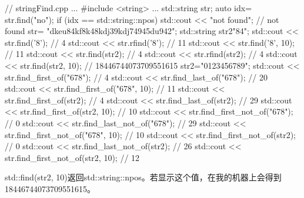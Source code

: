 
\begin{cpp}
// stringFind.cpp
...
#include <string>
...
std::string str;
auto idx= str.find("no");
if (idx == std::string::npos) std::cout << "not found"; // not found
str= {"dkeu84kf8k48kdj39kdj74945du942"};
std::string str2{"84"};
std::cout << str.find('8'); // 4
std::cout << str.rfind('8'); // 11
std::cout << str.find('8', 10); // 11
std::cout << str.find(str2); // 4
std::cout << str.rfind(str2); // 4
std::cout << str.find(str2, 10); // 18446744073709551615
str2="0123456789";
std::cout << str.find_first_of("678"); // 4
std::cout << str.find_last_of("678"); // 20
std::cout << str.find_first_of("678", 10); // 11
std::cout << str.find_first_of(str2); // 4
std::cout << str.find_last_of(str2); // 29
std::cout << str.find_first_of(str2, 10); // 10
std::cout << str.find_first_not_of("678"); // 0
std::cout << str.find_last_not_of("678"); // 29
std::cout << str.find_first_not_of("678", 10); // 10
std::cout << str.find_first_not_of(str2); // 0
std::cout << str.find_last_not_of(str2); // 26
std::cout << str.find_first_not_of(str2, 10); // 12
\end{cpp}

std::find(str2, 10)返回std::string::npos。若显示这个值，在我的机器上会得到18446744073709551615。












